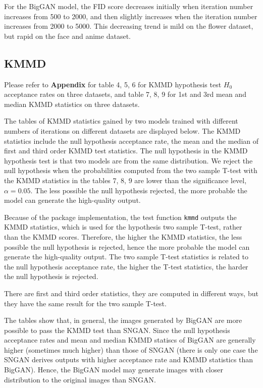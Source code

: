 \documentclass{article}
\begin{document}
For the BigGAN model, the FID score decreases initially when iteration number increases from 500 to 2000, and then slightly increases when the iteration number increases from 2000 to 5000. This decreasing trend is mild on the flower dataset, but rapid on the face and anime dataset.

\subsection{KMMD}
Please refer to \textbf{Appendix} for table 4, 5, 6 for KMMD hypothesis test $H_0$ acceptance rates on three datasets, and table 7, 8, 9 for 1st and 3rd mean and median KMMD statistics  on three datasets.

The tables of KMMD statistics gained by two models trained with different numbers of iterations on different datasets are displayed below. The KMMD statistics include the null hypothesis acceptance rate, the mean and the median of first and third order KMMD test statistics. The null hypothesis in the KMMD hypothesis test is that two models are from the same distribution. We reject the null hypothesis when the probabilities computed from the two sample T-test with the KMMD statistics in the tables 7, 8, 9 are lower than the significance level, $\alpha = 0.05$. The less possible the null hypothesis rejected, the more probable the model can generate the high-quality output.

Because of the package implementation, the test function \texttt{kmmd} outputs the KMMD statistics, which is used for the hypothesis two sample T-test, rather than the KMMD scores. Therefore, the higher the KMMD statistics, the less possible the null hypothesis is rejected, hence the more probable the model can generate the high-quality output. The two sample T-test statistics is related to the null hypothesis acceptance rate, the higher the T-test statistics, the harder the null hypothesis is rejected.

There are first and third order statistics, they are computed in different ways, but they have the same result for the two sample T-test.

The tables show that, in general, the images generated by BigGAN are more possible to pass the KMMD test than SNGAN. Since the null hypothesis acceptance rates and mean and median KMMD statiscs of BigGAN are generally higher (sometimes much higher) than those of SNGAN (there is only one case the SNGAN derives outputs with higher acceptance rate and KMMD statistics than BigGAN). Hence, the BigGAN model may generate images with closer distribution to the original images than SNGAN.
\end{document}
